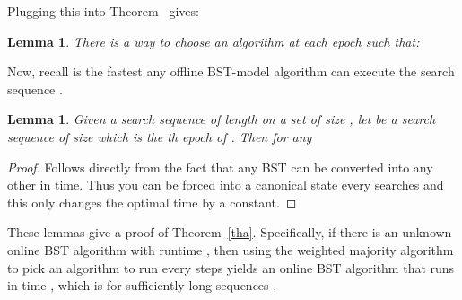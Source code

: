 \documentclass[11pt]{article}
\newtheorem{lemma}[theorem]{Lemma}
\begin{document}
Plugging this into Theorem~\label{main} gives:

\begin{lemma} \label{bsta} There is a way to choose an algorithm  at each epoch such that:

\end{lemma}

Now, recall   is the fastest any offline BST-model algorithm can execute the search sequence . 


\begin{lemma}
Given a search sequence  of length  on a set of size , let  be a search sequence of size  which is the th epoch of . Then for any 

\end{lemma}

\begin{proof}
Follows directly from the fact that any BST can be converted into any other in  time. Thus you can be forced into a canonical state every  searches and this only changes the optimal time by a constant.
\end{proof}


These lemmas give a proof of Theorem~\ref{tha}. Specifically, if there is an unknown online BST algorithm with runtime , then using the weighted majority algorithm to pick an algorithm to run every  steps yields an online BST algorithm that runs in time , which is  for sufficiently long sequences .





\end{document}
